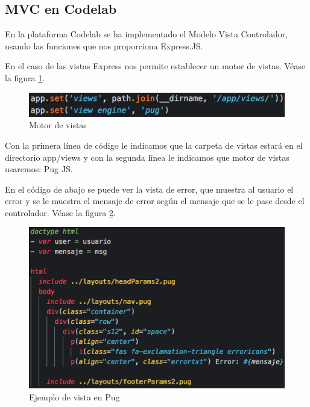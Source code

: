 \subsection{MVC en Codelab}
\label{3:3:2}

En la plataforma Codelab se ha implementado el Modelo Vista Controlador,
usando las funciones que nos proporciona Express.JS.

En el caso de las vistas Express nos permite establecer un motor de vistas. Véase la figura \ref{fig:Motor de vistas}.

\begin{figure}[!th]
\begin{center}
\includegraphics[scale=1.0]{images/defvistas}
\caption{Motor de vistas}
\label{fig:Motor de vistas}
\end{center}
\end{figure}

Con la primera línea de código le indicamos que la carpeta de vistas estará en el directorio app/views y con la segunda línea le indicamos que motor de vistas usaremos: Pug JS. 

En el código de abajo se puede ver la vista de error, que muestra al usuario el error y se le muestra el mensaje de error según el mensaje que se le pase desde el controlador.
Véase la figura \ref{fig:Ejemplo de vista en Pug}.

\begin{figure}[!th]
\begin{center}
\includegraphics[scale=0.5]{images/vista}
\caption{Ejemplo de vista en Pug}
\label{fig:Ejemplo de vista en Pug}
\end{center}
\end{figure}

